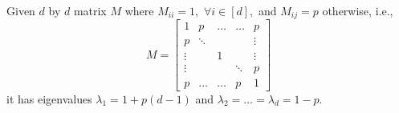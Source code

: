 \begin{lemma}
\label{lem:diag}
    Given $d$ by $d$ matrix $M$ where $M_{ii} = 1,$ $\forall i \in [d],$ and $M_{ij} = p$ otherwise, i.e., 
    \begin{equation*}
        M = \begin{bmatrix} 
            1 & p & \dots & \dots & p \\
            p & \ddots &  &  & \vdots\\
            \vdots & & 1  &  & \vdots\\
            \vdots & &   & \ddots & p\\
            p &   \dots     & \dots  & p & 1
            \end{bmatrix}
    \end{equation*}
    it has eigenvalues $\lambda_1 = 1 + p(d-1)$ and $\lambda_2 = \dots = \lambda_d = 1 - p$.
\end{lemma}
